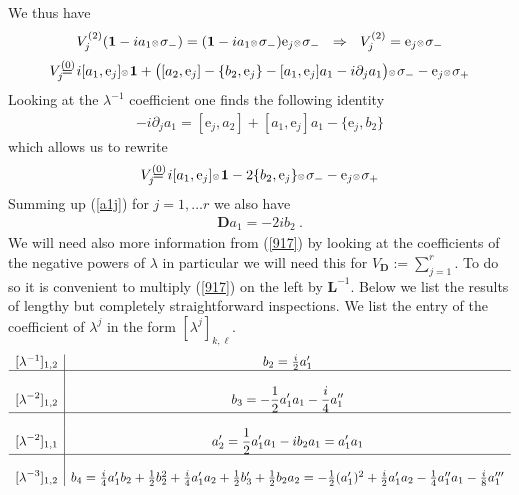 \documentclass{article}
\def\L{{\mathbf L}}
\def\ot{\hbox{\resizebox{6pt}{!}{$ \otimes \,
$}}}
\def \D{{\mathbf D}}
\def\s{\sigma}
\def\&{&\hspace{-20pt}}
\def\1{\mathbf 1}
\def \pa{\partial}
\newcommand{\be}{\begin{eqnarray}}
\newcommand{\ee}{\end{eqnarray}}
\newcommand{\ds}{\displaystyle}
\begin{document}
We thus have 
\be
V^{(2)}_j (\1 - ia_1\ot \s_-)  = (\1 - ia_1\ot \s_-)  {\mathrm e}_{j}\ot \s_- \ \ \Rightarrow \ \ V_j^{(2)} = {\mathrm e}_{j}\ot \s_-
\ee
\be
 V_j^{(0)} &\&= 
 i[a_1,{\mathrm e}_{j}]\ot \1 
  +\big( [a_2,{\mathrm e}_{j}]      -  \{b_2 ,{\mathrm e}_{j}\} -  [ a_1, {\mathrm e}_{j}]a_1 - i\pa_j a_1 \big)    \ot \s_- 
- {\mathrm e}_{j}\ot \s_+  
\ee
Looking at the $\lambda^{-1}$ coefficient one finds the following identity 
\be
-i \pa_j a_1 = [{\mathrm e}_{j},a_2] + [a_1,{\mathrm e}_{j}]a_1 -\{{\mathrm e}_{j}, b_2\} \label{a1j}
\ee
which allows us to rewrite 
\be
 V_j^{(0)} &\&= 
 i[a_1,{\mathrm e}_{j}]\ot \1 
    -2  \{b_2 ,{\mathrm e}_{j}\}   \ot \s_- 
- {\mathrm e}_{j}\ot \s_+  
\ee
Summing up (\ref{a1j}) for $j=1,\dots r$ we also have 
\be
 \D a_1= -2i b_2 \ .
\label{653}
\ee
We will need also more information from (\ref{917}) by looking at the coefficients of the negative powers of $\lambda$ in particular we will need this for $V_\D:= \sum_{j=1}^{r}$.
 To do so it is convenient to multiply (\ref{917}) on the left by $\L^{-1}$. 
Below we list the results of lengthy but completely straightforward inspections. We list the entry of the coefficient of $\lambda^{j}$ in the form $[\lambda^{j}]_{k,\ell}$. 
\be
\begin{array}{c|c}
[\lambda^{-1}]_{1,2} & 
b_2 = \frac i 2 a_1'\\
\hline\\
 \ds [\lambda^{-2}]_{1,2}  & 
\ds b_3 = -\frac 1 2 a_1' a_1 - \frac i 4 a_1''\\
\hline\\
\ds  [\lambda^{-2}]_{1,1}  & 
\ds a_2' =  \frac 1 2 a_1' a_1 - i b_2a_1 = a_1' a_1  \\
\hline\\
\ds [\lambda^{-3}]_{1,2}  & b_4 =
\frac i 4 a_1' b_2 + \frac 1 2 b_2^2 + \frac i 4 a_1' a_2 + \frac 1 2 b_3' + \frac 1 2 b_2 a_2 = 
 -\frac 12 (a_1')^2 + \frac i 2 a_1' a_2 - \frac 14 a_1'' a_1 - \frac i 8 a_1''' 
\end{array}
\label{656}
\ee
\end{document}
